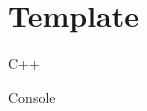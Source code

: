 \section{Template}

\begin{algorithm}{C++}
\end{algorithm}

\begin{algorithm}{Console}
\end{algorithm}

